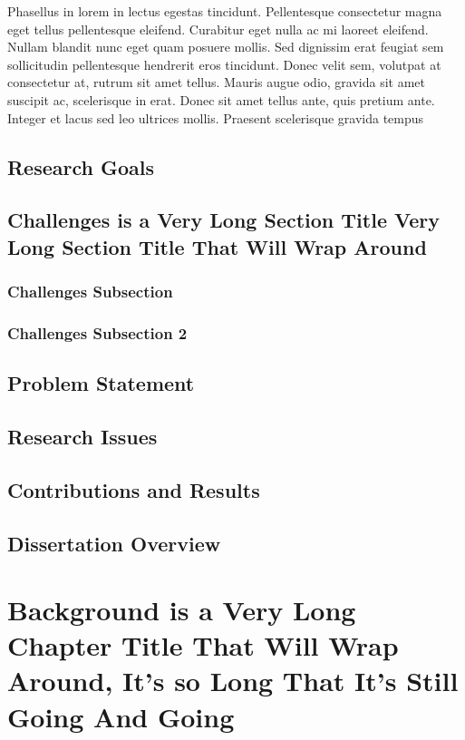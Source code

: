 \documentclass[12pt]{report}	%
\begin{document}
  Phasellus in lorem in lectus egestas tincidunt. Pellentesque consectetur magna eget tellus pellentesque eleifend. Curabitur eget nulla ac mi laoreet eleifend. Nullam blandit nunc eget quam posuere mollis. Sed dignissim erat feugiat sem sollicitudin pellentesque hendrerit eros tincidunt. Donec velit sem, volutpat at consectetur at, rutrum sit amet tellus. Mauris augue odio, gravida sit amet suscipit ac, scelerisque in erat. Donec sit amet tellus ante, quis pretium ante. Integer et lacus sed leo ultrices mollis. Praesent scelerisque gravida tempus
	\section{Research Goals}
	\section{Challenges is a Very Long Section Title Very Long Section Title That Will Wrap Around}
	    \subsection{Challenges Subsection}
	    \subsection{Challenges Subsection 2}
	\section{Problem Statement}
	\section{Research Issues}
	\section{Contributions and Results}
	\section{Dissertation Overview}

\chapter{Background is a Very Long Chapter Title That Will Wrap Around, It's so Long That It's Still Going And Going}
\end{document}
